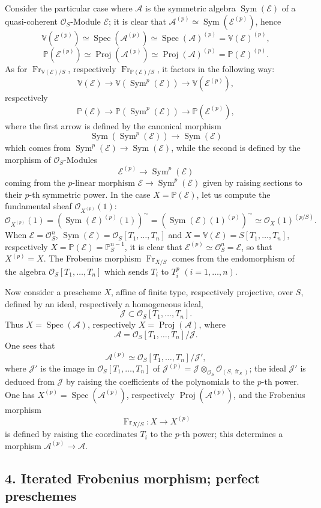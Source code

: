 \documentclass[11pt]{article}
\DeclareMathOperator{\Spec}{Spec}
\providecommand{\OO}{\mathcal{O}}
\providecommand{\cE}{\mathcal E}
\providecommand{\Spec}{\operatorname{Spec}}
\providecommand{\Sym}{\operatorname{Sym}}
\providecommand{\Spec}{\operatorname{Spec}}
\providecommand{\Spec}{\operatorname{Spec}}
\providecommand{\fr}{\operatorname{fr}}
\providecommand{\Fr}{\operatorname{Fr}}
\providecommand{\Proj}{\operatorname{Proj}}
\providecommand{\Sym}{\operatorname{Sym}}
\providecommand{\JJ}{\mathcal J}
\providecommand{\Fr}{\operatorname{Fr}}
\providecommand{\fr}{\operatorname{fr}}
\providecommand{\Spec}{\operatorname{Spec}}
\begin{document}
Consider the particular case where $\mathcal{A}$ is the symmetric algebra $\Sym(\cE)$ of a quasi-coherent $\OO_S$-Module $\cE$; it is clear that $\mathcal{A}^{(p)}\simeq\Sym(\cE^{(p)})$, hence
\[
\mathbb V(\cE^{(p)})\simeq\Spec(\mathcal{A}^{(p)})\simeq\Spec(\mathcal{A})^{(p)}=\mathbb V(\cE)^{(p)},
\]
\[
\mathbb P(\cE^{(p)})\simeq\Proj(\mathcal{A}^{(p)})\simeq\Proj(\mathcal{A})^{(p)}=\mathbb P(\cE)^{(p)}.
\]
As for $\Fr_{\mathbb V(\cE)/S}$, respectively $\Fr_{\mathbb P(\cE)/S}$, it factors in the following way:
\[
\mathbb V(\cE)\longrightarrow \mathbb V(\Sym^p(\cE))\longrightarrow \mathbb V(\cE^{(p)}),
\]
respectively
\[
\mathbb P(\cE)\longrightarrow \mathbb P(\Sym^p(\cE))\longrightarrow \mathbb P(\cE^{(p)}),
\]
where the first arrow is defined by the canonical morphism
\[
\Sym(\Sym^p(\cE))\longrightarrow \Sym(\cE)
\]
which comes from $\Sym^p(\cE)\to\Sym(\cE)$, while the second is defined by the morphism of $\OO_S$-Modules
\[
\cE^{(p)}\longrightarrow \Sym^p(\cE)
\]
coming from the $p$-linear morphism $\cE\to\Sym^p(\cE)$ given by raising sections to their $p$-th symmetric power. In the case $X=\mathbb P(\cE)$, let us compute the fundamental sheaf $\OO_{X^{(p)}}(1)$:
\[
\OO_{X^{(p)}}(1)=(\Sym(\cE)^{(p)}(1))^{\sim}
=(\Sym(\cE)(1)^{(p)})^{\sim}
\simeq \OO_X(1)^{(p/S)}.
\]
When $\cE=\OO_S^n$, $\Sym(\cE)=\OO_S[T_1,\ldots,T_n]$ and $X=\mathbb V(\cE)=S[T_1,\ldots,T_n]$, respectively $X=\mathbb P(\cE)=\mathbb P_S^{n-1}$, it is clear that $\cE^{(p)}\simeq\OO_S^n=\cE$, so that $X^{(p)}=X$. The Frobenius morphism $\Fr_{X/S}$ comes from the endomorphism of the algebra $\OO_S[T_1,\ldots,T_n]$ which sends $T_i$ to $T_i^p$ $(i=1,\ldots,n)$.

Now consider a prescheme $X$, affine of finite type, respectively projective, over $S$, defined by an ideal, respectively a homogeneous ideal,
\[
\JJ\subset \OO_S[T_1,\ldots,T_n].
\]
Thus $X=\Spec(\mathcal{A})$, respectively $X=\Proj(\mathcal{A})$, where
\[
\mathcal{A}=\OO_S[T_1,\ldots,T_n]/\JJ.
\]
One sees that
\[
\mathcal{A}^{(p)}
\simeq \OO_S[T_1,\ldots,T_n]/\JJ',
\]
where $\JJ'$ is the image in $\OO_S[T_1,\ldots,T_n]$ of
$\JJ^{(p)}=\JJ\otimes_{\OO_S}\OO_{(S,\fr_S)}$; the ideal $\JJ'$ is
deduced from $\JJ$ by raising the coefficients of the polynomials to
the $p$-th power. One has $X^{(p)}=\Spec(\mathcal{A}^{(p)})$, respectively $\Proj(\mathcal{A}^{(p)})$, and the Frobenius morphism
\[
\Fr_{X/S}:X\longrightarrow X^{(p)}
\]
is defined by raising the coordinates $T_i$ to the $p$-th power; this determines a morphism $\mathcal{A}^{(p)}\to\mathcal{A}$.


\subsection*{4. Iterated Frobenius morphism; perfect preschemes}\label{sga5:XV:subsection:4}
\end{document}
